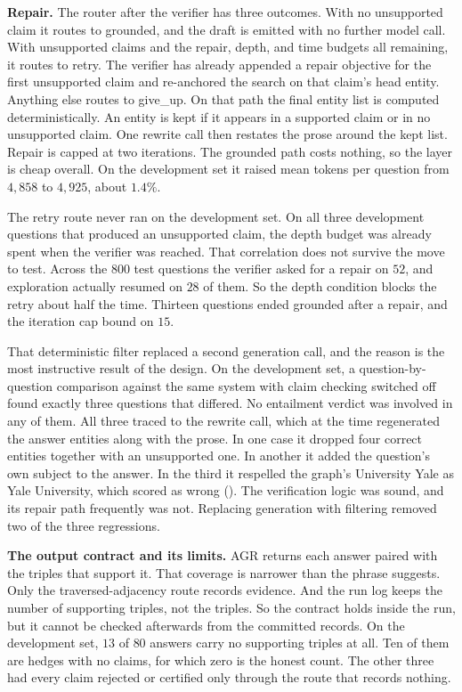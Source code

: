 \textbf{Repair.} The router after the verifier has three outcomes. With no
unsupported claim it routes to \textsf{grounded}, and the draft is emitted with
no further model call. With unsupported claims and the repair, depth, and time
budgets all remaining, it routes to \textsf{retry}. The verifier has already
appended a repair objective for the first unsupported claim and re-anchored the
search on that claim's head entity. Anything else routes to \textsf{give\_up}.
On that path the final entity list is computed deterministically. An entity is
kept if it appears in a supported claim or in no unsupported claim. One rewrite
call then restates the prose around the kept list. Repair is capped at two
iterations. The grounded path costs nothing, so the layer is cheap overall. On
the development set it raised mean tokens per question from $4{,}858$ to
$4{,}925$, about $1.4\%$.

The retry route never ran on the development set. On all three development
questions that produced an unsupported claim, the depth budget was already spent
when the verifier was reached. That correlation does not survive the move to
test. Across the $800$ test questions the verifier asked for a repair on $52$,
and exploration actually resumed on $28$ of them. So the depth condition blocks
the retry about half the time. Thirteen questions ended grounded after a repair,
and the iteration cap bound on $15$.

That deterministic filter replaced a second generation call, and the reason is
the most instructive result of the design. On the development set, a
question-by-question comparison against the same system with claim checking
switched off found exactly three questions that differed. No entailment verdict
was involved in any of them. All three traced to the rewrite call, which at the
time regenerated the answer entities along with the prose. In one case it
dropped four correct entities together with an unsupported one. In another it
added the question's own subject to the answer. In the third it respelled the
graph's \textsf{University Yale} as \textsf{Yale University}, which scored as
wrong (). The verification logic was sound, and its repair
path frequently was not. Replacing generation with filtering removed two of the
three regressions.

\textbf{The output contract and its limits.} AGR returns each answer paired with
the triples that support it. That coverage is narrower than the phrase suggests.
Only the traversed-adjacency route records evidence. And the run log keeps the
number of supporting triples, not the triples. So the contract holds inside the
run, but it cannot be checked afterwards from the committed records. On the
development set, $13$ of $80$ answers carry no supporting triples at all. Ten of
them are hedges with no claims, for which zero is the honest count. The other
three had every claim rejected or certified only through the route that records
nothing.

